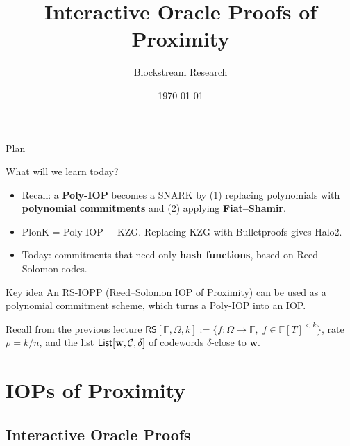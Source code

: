 \documentclass{zkdl-presentation-template}
\title[IOPs of Proximity]{\textbf{Interactive Oracle Proofs of Proximity}}
\author{Blockstream Research}
\date{\today}
\begin{document}
    \maketitleframe

    \begin{frame}{Plan}
      \tableofcontents[hideallsubsections]
    \end{frame}

    \begin{frame}{What will we learn today?}
        \begin{itemize}
            \item Recall: a \textbf{Poly-IOP} becomes a SNARK by (1) replacing polynomials with \textbf{polynomial commitments} and (2) applying \textbf{Fiat--Shamir}.\pause
            \item PlonK = Poly-IOP + KZG. Replacing KZG with Bulletproofs gives Halo2.\pause
            \item Today: commitments that need only \textbf{hash functions}, based on Reed--Solomon codes.
        \end{itemize}
        \pause

        \begin{remarkblock}{Key idea}
            An RS-IOPP (Reed--Solomon IOP of Proximity) can be used as a polynomial commitment scheme, which turns a Poly-IOP into an IOP.
        \end{remarkblock}
        \pause

        \begin{remarkblock}{Recall from the previous lecture}
            $\mathsf{RS}[\mathbb{F},\Omega,k] := \{\overline{f}: \Omega \to \mathbb{F}, \; f \in \mathbb{F}[T]^{<k}\}$, rate $\rho = k/n$, and the list $\mathsf{List}[\mathbf{w},\mathcal{C},\delta]$ of codewords $\delta$-close to $\mathbf{w}$.
        \end{remarkblock}
    \end{frame}

    \section{IOPs of Proximity}

    \subsection{Interactive Oracle Proofs}
\end{document}
